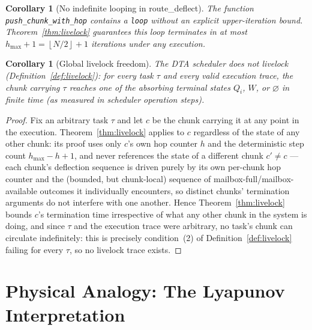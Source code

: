 \documentclass[11pt,a4paper]{article}
\newtheorem{corollary}[theorem]{Corollary}
\newcommand{\floor}[1]{\left\lfloor #1 \right\rfloor}
\newcommand{\code}[1]{\texttt{#1}}
\begin{document}
\begin{corollary}[No indefinite looping in route\_deflect]
\label{cor:nodeflectloop}
The function \code{push\_chunk\_with\_hop} contains a \code{loop}
without an explicit upper-iteration bound.  Theorem~\ref{thm:livelock}
guarantees this loop terminates in at most
$h_{\max} + 1 = \floor{N/2} + 1$ iterations under any execution.
\end{corollary}

\begin{corollary}[Global livelock freedom]
\label{cor:global}
The DTA scheduler does not livelock (Definition~\ref{def:livelock}):
for every task $\tau$ and every valid execution trace, the chunk
carrying $\tau$ reaches one of the absorbing terminal states $Q_i$,
$W$, or $\varnothing$ in finite time (as measured in scheduler
operation steps).
\end{corollary}

\begin{proof}
Fix an arbitrary task $\tau$ and let $c$ be the chunk carrying it at
any point in the execution. Theorem~\ref{thm:livelock} applies to $c$
regardless of the state of any other chunk: its proof uses only $c$'s
own hop counter $h$ and the deterministic step count $h_{\max}-h+1$,
and never references the state of a different chunk $c' \neq c$ ---
each chunk's deflection sequence is driven purely by its own
per-chunk hop counter and the (bounded, but chunk-local) sequence of
mailbox-full/mailbox-available outcomes it individually encounters, so
distinct chunks' termination arguments do not interfere with one
another. Hence Theorem~\ref{thm:livelock} bounds $c$'s termination time
irrespective of what any other chunk in the system is doing, and since
$\tau$ and the execution trace were arbitrary, no task's chunk can
circulate indefinitely: this is precisely condition~(2) of
Definition~\ref{def:livelock} failing for every $\tau$, so no livelock
trace exists.
\end{proof}

\section{Physical Analogy: The Lyapunov Interpretation}
\end{document}
